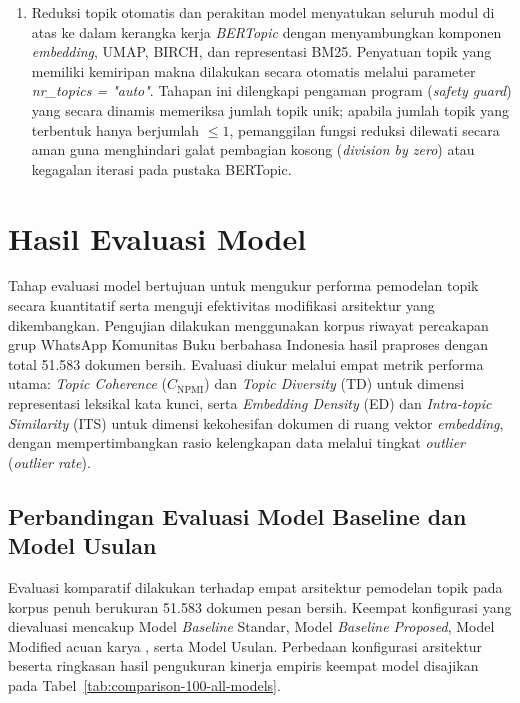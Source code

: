 \begin{enumerate}[label=\arabic*., leftmargin=*, itemsep=6pt]
    \item Reduksi topik otomatis dan perakitan model menyatukan seluruh modul di atas ke dalam kerangka kerja \textit{BERTopic} dengan menyambungkan komponen \textit{embedding}, UMAP, BIRCH, dan representasi BM25. Penyatuan topik yang memiliki kemiripan makna dilakukan secara otomatis melalui parameter \textit{nr\_topics = "auto"}. Tahapan ini dilengkapi pengaman program (\textit{safety guard}) yang secara dinamis memeriksa jumlah topik unik; apabila jumlah topik yang terbentuk hanya berjumlah $\le 1$, pemanggilan fungsi reduksi dilewati secara aman guna menghindari galat pembagian kosong (\textit{division by zero}) atau kegagalan iterasi pada pustaka BERTopic.
\end{enumerate}

\section{Hasil Evaluasi Model}
\label{sec:model-evaluation-results}

Tahap evaluasi model bertujuan untuk mengukur performa pemodelan topik secara kuantitatif serta menguji efektivitas modifikasi arsitektur yang dikembangkan. Pengujian dilakukan menggunakan korpus riwayat percakapan grup WhatsApp Komunitas Buku berbahasa Indonesia hasil praproses dengan total 51.583 dokumen bersih. Evaluasi diukur melalui empat metrik performa utama: \textit{Topic Coherence} ($C_{\text{NPMI}}$) dan \textit{Topic Diversity} (TD) untuk dimensi representasi leksikal kata kunci, serta \textit{Embedding Density} (ED) dan \textit{Intra-topic Similarity} (ITS) untuk dimensi kekohesifan dokumen di ruang vektor \textit{embedding}, dengan mempertimbangkan rasio kelengkapan data melalui tingkat \textit{outlier} (\textit{outlier rate}).

\subsection{Perbandingan Evaluasi Model Baseline dan Model Usulan}
\label{subsec:evaluasi-komparasi-model}

Evaluasi komparatif dilakukan terhadap empat arsitektur pemodelan topik pada korpus penuh berukuran 51.583 dokumen pesan bersih. Keempat konfigurasi yang dievaluasi mencakup Model \textit{Baseline} Standar, Model \textit{Baseline Proposed}, Model Modified acuan karya \cite{iaes2025indobert}, serta Model Usulan. Perbedaan konfigurasi arsitektur beserta ringkasan hasil pengukuran kinerja empiris keempat model disajikan pada Tabel~\ref{tab:comparison-100-all-models}.

